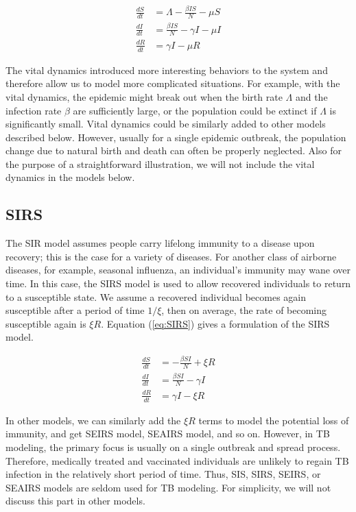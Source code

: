 \documentclass[8pt,twocolumn]{extarticle}
\begin{document}
\begin{align*}
\frac{dS}{dt} & =\Lambda -\frac{\beta IS}{N} -\mu S \\
\frac{dI}{dt} & =\frac{\beta IS}{N} -\gamma I-\mu I \\
\frac{dR}{dt} & =\gamma I-\mu R
\end{align*}

The vital dynamics introduced more interesting behaviors to the system and therefore allow us to model more complicated situations. For example, with the vital dynamics, the epidemic might break out when the birth rate $\Lambda$ and the infection rate $\beta$ are sufficiently large, or the population could be extinct if $\Lambda$ is significantly small. Vital dynamics could be similarly added to other models described below. However, usually for a single epidemic outbreak, the population change due to natural birth and death can often be properly neglected. Also for the purpose of a straightforward illustration, we will not include the vital dynamics in the models below.
\subsection{SIRS}
The SIR model assumes people carry lifelong immunity to a disease upon recovery; this is the case for a variety of diseases. For another class of airborne diseases, for example, seasonal influenza, an individual’s immunity may wane over time. In this case, the SIRS model is used to allow recovered individuals to return to a susceptible state. We assume a recovered individual becomes again susceptible after a period of time $1/\xi$, then on average, the rate of becoming susceptible again is $\xi R$. Equation (\ref{eq:SIRS}) gives a formulation of the SIRS model.

\begin{align}
\frac{dS}{dt} & =- \frac{\beta SI}{N} + \xi R \nonumber \\
\frac{dI}{dt} & = \frac{\beta SI}{N} - \gamma I \nonumber\\
\frac{dR}{dt} & = \gamma I - \xi R \label{eq:SIRS}
\end{align}

In other models, we can similarly add the $\xi R$ terms to model the potential loss of immunity, and get SEIRS model, SEAIRS model, and so on. However, in TB modeling, the primary focus is usually on a single outbreak and spread process. Therefore, medically treated and vaccinated individuals are unlikely to regain TB infection in the relatively short period of time. Thus, SIS, SIRS, SEIRS, or SEAIRS models are seldom used for TB modeling. For simplicity, we will not discuss this part in other models. 
\end{document}
